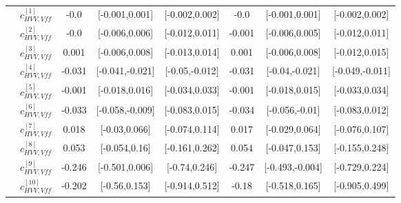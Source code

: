 \documentclass{article}
\begin{document}
\begin{table}[H]
\begin{tabular}{|c|c|c|c|c|c|c|c|}
 & $c_{HVV,Vff}^{[1]}$ & -0.0                             & [-0.001,0.001]                                 & [-0.002,0.002] & -0.0                             & [-0.001,0.001]                                 & [-0.002,0.002] \\ \cline{2-8}
 & $c_{HVV,Vff}^{[2]}$ & -0.0                             & [-0.006,0.006]                                 & [-0.012,0.011] & -0.001                             & [-0.006,0.005]                                 & [-0.012,0.011] \\ \cline{2-8}
 & $c_{HVV,Vff}^{[3]}$ & 0.001                             & [-0.006,0.008]                                 & [-0.013,0.014] & 0.001                             & [-0.006,0.008]                                 & [-0.012,0.015] \\ \cline{2-8}
 & $c_{HVV,Vff}^{[4]}$ & -0.031                             & [-0.041,-0.021]                                 & [-0.05,-0.012] & -0.031                             & [-0.04,-0.021]                                 & [-0.049,-0.011] \\ \cline{2-8}
 & $c_{HVV,Vff}^{[5]}$ & -0.001                             & [-0.018,0.016]                                 & [-0.034,0.033] & -0.001                             & [-0.018,0.015]                                 & [-0.033,0.034] \\ \cline{2-8}
 & $c_{HVV,Vff}^{[6]}$ & -0.033                             & [-0.058,-0.009]                                 & [-0.083,0.015] & -0.034                             & [-0.056,-0.01]                                 & [-0.083,0.012] \\ \cline{2-8}
 & $c_{HVV,Vff}^{[7]}$ & 0.018                             & [-0.03,0.066]                                 & [-0.074,0.114] & 0.017                             & [-0.029,0.064]                                 & [-0.076,0.107] \\ \cline{2-8}
 & $c_{HVV,Vff}^{[8]}$ & 0.053                             & [-0.054,0.16]                                 & [-0.161,0.262] & 0.054                             & [-0.047,0.153]                                 & [-0.155,0.248] \\ \cline{2-8}
 & $c_{HVV,Vff}^{[9]}$ & -0.246                             & [-0.501,0.006]                                 & [-0.74,0.246] & -0.247                             & [-0.493,-0.004]                                 & [-0.729,0.224] \\ \cline{2-8}
 & $c_{HVV,Vff}^{[10]}$ & -0.202                             & [-0.56,0.153]                                 & [-0.914,0.512] & -0.18                             & [-0.518,0.165]                                 & [-0.905,0.499] \\ \cline{2-8}

\end{tabular}
\end{table}
\end{document}
